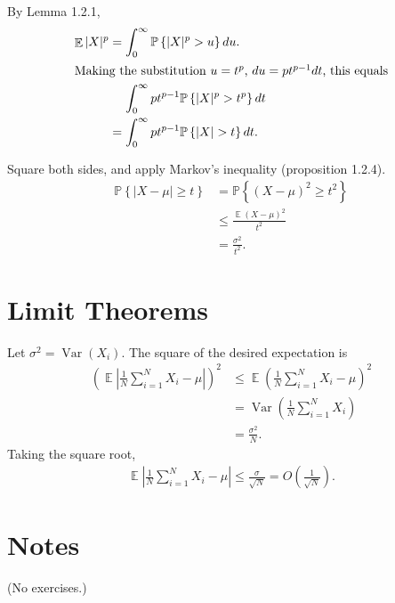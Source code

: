 \documentclass{report}
\theoremstyle{definition}
\newenvironment{exercise}[1]{
  \renewcommand\theexerciseimpl{#1}
  \exerciseimpl
}{\endexerciseimpl}
\DeclareMathOperator{\E}{\mathbb{E}}
\renewcommand{\P}[1]{\mathbb{P}\left\{#1\right\}}
\DeclareMathOperator{\Var}{\mathrm{Var}}
\begin{document}
\begin{exercise}{1.2.3}
  By Lemma 1.2.1,
  \begin{align*}
    \E |X|^p & = \int_0^\infty \P{|X|^p > u} du. \\
    \intertext{Making the substitution $u = t^p$, $du = p t^{p-1} dt$, this equals}
    & \mathrel{\phantom{=}} \int_0^\infty p t^{p-1} \P{|X|^p > t^p} dt \\
    & = \int_0^\infty p t^{p-1} \P{|X| > t} dt.
  \end{align*}
\end{exercise}

\begin{exercise}{1.2.6}
  Square both sides, and apply Markov's inequality (proposition 1.2.4).
  \begin{align*}
    \P{|X - \mu| \ge t} & = \P{(X - \mu)^2 \ge t^2} \\
    & \le \frac{\E (X - \mu)^2}{t^2} \\
    & = \frac{\sigma^2}{t^2}.
  \end{align*}
\end{exercise}

\section{Limit Theorems}

\begin{exercise}{1.3.3}
  Let $\sigma^2 = \Var(X_i)$.  The square of the desired expectation is
  \begin{align*}
    \left(\E \left|\frac{1}{N} \sum_{i=1}^N X_i - \mu\right|\right)^2 & \le \E \left(\frac{1}{N} \sum_{i=1}^N X_i - \mu\right)^2 \tag{by Jensen's inequality} \\
    & = \Var \left(\frac{1}{N} \sum_{i=1}^N X_i\right) \\
    & = \frac{\sigma^2}{N}. \tag{by equation 1.5}
  \end{align*}
  Taking the square root,
  \begin{align*}
    \E \left|\frac{1}{N} \sum_{i=1}^N X_i - \mu\right| \le \frac{\sigma}{\sqrt{N}} = O\left(\frac{1}{\sqrt{N}}\right).
  \end{align*}
\end{exercise}

\section{Notes}

(No exercises.)
\end{document}
